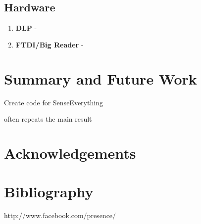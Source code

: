 \documentclass{article}
\begin{document}
	\subsection{Hardware}
		\begin{enumerate}
		\item  { \bf DLP } -

		\item  { \bf FTDI/Big Reader } -

		\end{enumerate}
		

	
\section{Summary and Future Work}
Create code for SenseEverything 

	often repeats the main result 
\section{Acknowledgements}
\section{Bibliography} 
	http://www.facebook.com/presence/
\end{document}
